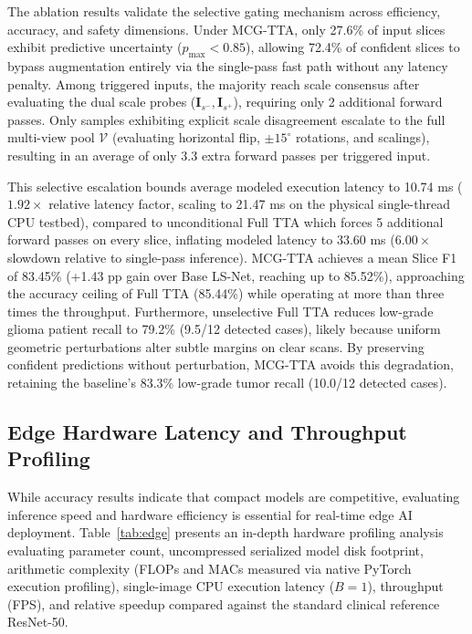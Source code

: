 The ablation results validate the selective gating mechanism across efficiency, accuracy, and safety dimensions. Under MCG-TTA, only 27.6\% of input slices exhibit predictive uncertainty ($p_{\max} < 0.85$), allowing 72.4\% of confident slices to bypass augmentation entirely via the single-pass fast path without any latency penalty. Among triggered inputs, the majority reach scale consensus after evaluating the dual scale probes ($\mathbf{I}_{s^-}, \mathbf{I}_{s^+}$), requiring only 2 additional forward passes. Only samples exhibiting explicit scale disagreement escalate to the full multi-view pool $\mathcal{V}$ (evaluating horizontal flip, $\pm 15^\circ$ rotations, and scalings), resulting in an average of only 3.3 extra forward passes per triggered input.

This selective escalation bounds average modeled execution latency to 10.74 ms ($1.92\times$ relative latency factor, scaling to 21.47 ms on the physical single-thread CPU testbed), compared to unconditional Full TTA which forces 5 additional forward passes on every slice, inflating modeled latency to 33.60 ms ($6.00\times$ slowdown relative to single-pass inference). MCG-TTA achieves a mean Slice F1 of 83.45\% (+1.43 pp gain over Base LS-Net, reaching up to 85.52\%), approaching the accuracy ceiling of Full TTA (85.44\%) while operating at more than three times the throughput. Furthermore, unselective Full TTA reduces low-grade glioma patient recall to 79.2\% (9.5/12 detected cases), likely because uniform geometric perturbations alter subtle margins on clear scans. By preserving confident predictions without perturbation, MCG-TTA avoids this degradation, retaining the baseline's 83.3\% low-grade tumor recall (10.0/12 detected cases).

\subsection{Edge Hardware Latency and Throughput Profiling}

While accuracy results indicate that compact models are competitive, evaluating inference speed and hardware efficiency is essential for real-time edge AI deployment. Table~\ref{tab:edge} presents an in-depth hardware profiling analysis evaluating parameter count, uncompressed serialized model disk footprint, arithmetic complexity (FLOPs and MACs measured via native PyTorch execution profiling), single-image CPU execution latency ($B=1$), throughput (FPS), and relative speedup compared against the standard clinical reference ResNet-50.

